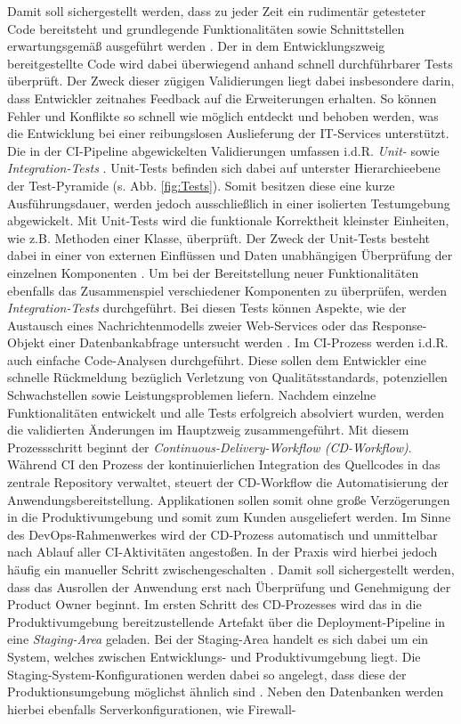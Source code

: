 Damit soll sichergestellt werden, dass zu jeder Zeit ein rudimentär getesteter Code bereitsteht und grundlegende Funktionalitäten sowie Schnittstellen erwartungsgemäß ausgeführt werden \cite[19]{Halstenberg.2020}. Der in dem Entwicklungszweig bereitgestellte Code wird dabei überwiegend anhand schnell durchführbarer Tests überprüft. Der Zweck dieser zügigen Validierungen liegt dabei insbesondere darin, dass Entwickler zeitnahes Feedback auf die Erweiterungen erhalten. So können Fehler und Konflikte so schnell wie möglich entdeckt und behoben werden, was die Entwicklung bei einer reibungslosen Auslieferung der IT-Services unterstützt. Die in der CI-Pipeline abgewickelten Validierungen umfassen i.d.R. \textit{Unit-} sowie \textit{Integration-Tests} \cite[Kap. 1.2]{Labouardy.2021}. Unit-Tests befinden sich dabei auf unterster Hierarchieebene der Test-Pyramide (s. Abb. \ref*{fig:Tests}). Somit besitzen diese eine kurze Ausführungsdauer, werden jedoch ausschließlich in einer isolierten Testumgebung abgewickelt. Mit Unit-Tests wird die funktionale Korrektheit kleinster Einheiten, wie z.B. Methoden einer Klasse, über\-prüft. Der Zweck der Unit-Tests besteht dabei in einer von externen Einflüssen und Daten unabhängigen Überprüfung der einzelnen Komponenten \cite[Kap. 2]{Hambling.2015}. Um bei der Bereitstellung neuer Funktionalitäten ebenfalls das Zusammenspiel verschiedener Komponenten zu überprüfen, werden \textit{Integration-Tests} durchgeführt. Bei diesen Tests können Aspekte, wie der Austausch eines Nachrichtenmodells zweier Web-Services oder das Response-Objekt einer Datenbankabfrage untersucht werden \cite[Kap. 2]{Hambling.2015}. Im CI-Prozess werden i.d.R. auch einfache Code-Analysen durchgeführt. Diese sollen dem Entwickler eine schnelle Rückmeldung bezüglich Verletzung von Qualitätsstandards, potenziellen Schwachstellen sowie Leistungsproblemen liefern. Nachdem einzelne Funktionalitäten entwickelt und alle Tests erfolgreich absolviert wurden, werden die validierten Än\-derungen im Hauptzweig zusammengeführt. Mit diesem Prozessschritt beginnt der \textit{Continuous-Delivery-Workflow (\acs{CD}-Workflow)}.  Während CI den Prozess der kontinuierlichen Integration des Quellcodes in das zentrale Repository verwaltet, steuert der CD-Workflow die Automatisierung der Anwendungsbereitstellung. Applikationen sollen somit ohne große Verzögerungen in die Produktivumgebung und somit zum Kunden ausgeliefert werden. Im Sinne des DevOps-Rahmenwerkes wird der CD-Prozess automatisch und unmittelbar nach Ablauf aller CI-Aktivitäten angestoßen. In der Praxis wird hierbei jedoch häufig ein manueller Schritt zwischengeschalten \cite[20]{Halstenberg.2020}. Damit soll sichergestellt werden, dass das Ausrollen der Anwendung erst nach Überprüfung und Genehmigung der Product Owner beginnt. Im ersten Schritt des CD-Prozesses wird das in die Produktivumgebung bereitzustellende Artefakt über die Deployment-Pipeline in eine \textit{Staging-Area} geladen. Bei der Staging-Area handelt es sich dabei um ein System, welches zwischen Entwicklungs- und Produktivumgebung liegt. Die Staging-System-Konfigurationen werden dabei so angelegt, dass diese der Produktionsumgebung möglichst ähnlich sind \cite[Kap. 1.3]{Labouardy.2021}. Neben den Datenbanken werden hierbei ebenfalls Serverkonfigurationen, wie Firewall- 